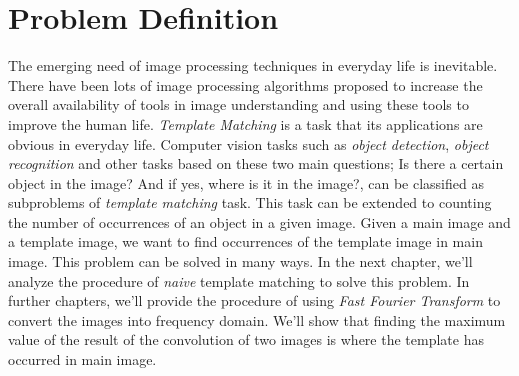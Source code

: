 \chapter{Problem Definition}

The emerging need of image processing techniques in everyday life is inevitable. There have been lots of image processing algorithms proposed to increase the overall availability of tools in image understanding and using these tools to improve the human life. \textit{Template Matching} is a task that its applications are obvious in everyday life. Computer vision tasks such as \textit{object detection}, \textit{object recognition} and other tasks based on these two main questions; Is there a certain object in the image? And if yes, where is it in the image?, can be classified as subproblems of \textit{template matching} task. This task can be extended to counting the number of occurrences of an object in a given image. Given a main image and a template image, we want to find occurrences of the template image in main image. This problem can be solved in many ways. In the next chapter, we'll analyze the procedure of \textit{naive} template matching to solve this problem. In further chapters, we'll provide the procedure of using \textit{Fast Fourier Transform} to convert the images into frequency domain. We'll show that finding the maximum value of the result of the convolution of two images is where the template has occurred in main image.
